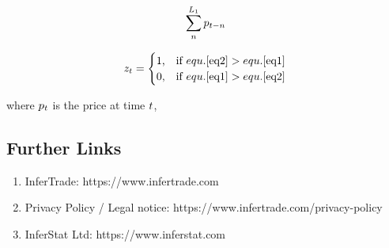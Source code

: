 \documentclass{article}
\begin{document}
\begin{equation}
\sum_{n}^{L_{1}} p_{t - n} \\
\label{eq2}
\end{equation}

\[ z_t = \begin{cases} \mbox{1,} & \mbox{if } equ.\ref{eq2}>equ.\ref{eq1} \\ \mbox{0,} & \mbox{if } equ.\ref{eq1}>equ.\ref{eq2} \end{cases} \]


\hspace{200mm}

where $p_t$ is the price at time $t$,

\hspace{200mm}
\hspace{200mm}

\subsection*{Further Links}

\begin{enumerate}
    \item InferTrade: https://www.infertrade.com
    \item Privacy Policy / Legal notice: https://www.infertrade.com/privacy-policy
    \item InferStat Ltd: https://www.inferstat.com
\end{enumerate}
\end{document}
